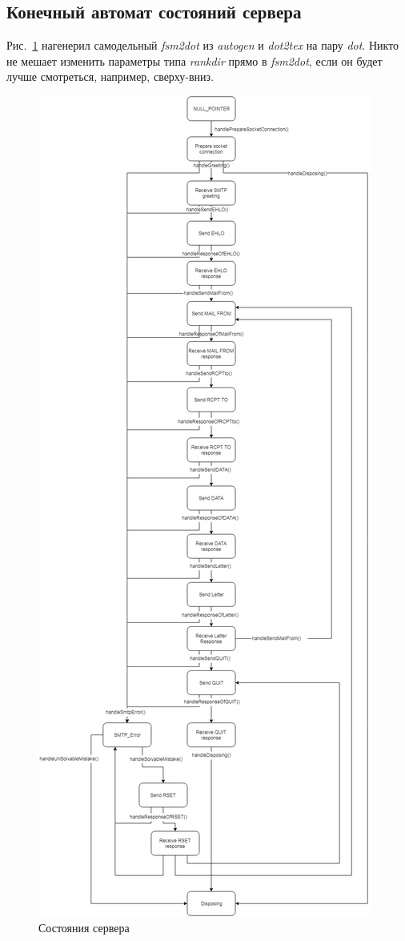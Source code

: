 \documentclass[a4paper,12pt]{report}
\begin{document}
\subsection{Конечный автомат состояний сервера}

Рис.~\ref{fig:fsm} нагенерил самодельный \textit{fsm2dot} из \textit{autogen} и \textit{dot2tex} на пару \textit{dot}. Никто не мешает изменить параметры типа \textit{rankdir} прямо в \textit{fsm2dot}, если он будет лучше смотреться, например, сверху-вниз.

\begin{figure}
\centering
\includegraphics[height=\textheight]{static/ClientDiagram_Final.jpg}
\caption{Состояния сервера}
\label{fig:fsm}
\end{figure}
\end{document}
